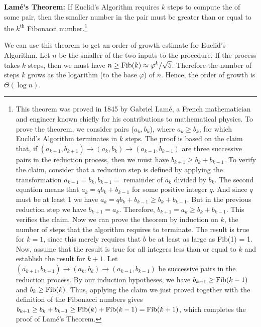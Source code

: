 \begin{niceQuote}
\textbf{Lam\'e's Theorem:} If Euclid's Algorithm requires \( k \) steps to
compute the  of some pair, then the smaller number in the pair
must be greater than or equal to the \( k^{\mathrm{th}} \) Fibonacci number.\footnote{This
theorem was proved in 1845 by Gabriel Lam\'e, a French mathematician and
engineer known chiefly for his contributions to mathematical physics.  To prove
the theorem, we consider pairs (\( a_k, b_k \)), where \( a_k \ge
b_k \), for which Euclid's Algorithm terminates in \( k \) steps.  The proof
is based on the claim that, if \( (a_{k+1}, b_{k+1}) \to
(a_k, b_k) \to (a_{k-1}, b_{k-1}) \) are three
successive pairs in the reduction process, then we must have \( b_{k+1} \ge
b_k + b_{k-1} \).  To verify the claim, consider that a reduction
step is defined by applying the transformation \( a_{k-1} = b_k,
b_{k-1} = \) remainder of \( a_k \) divided by \( b_k \).  The second
equation means that \( a_k = qb_k + b_{k-1} \) for some
positive integer \( q \).  And since \( q \) must be at least 1 we have \( a_k
= qb_k + b_{k-1} \ge b_k + b_{k-1} \).  But in
the previous reduction step we have \( b_{k+1} = a_k \).  Therefore,
\( b_{k+1} = a_k \ge b_k + b_{k-1} \).  This verifies
the claim.  Now we can prove the theorem by induction on \( k \), the number of
steps that the algorithm requires to terminate.  The result is true for \( k =
1 \), since this merely requires that \( b \) be at least as large as Fib(1)
= 1.  Now, assume that the result is true for all integers less than or equal
to \( k \) and establish the result for \( k + 1 \).  Let \( (a_{k+1},
b_{k+1}) \to (a_k, b_k) \to (a_{k-1}, b_{k-1}) \) be successive pairs in the
reduction process.  By our
induction hypotheses, we have \( b_{k-1} \ge {\rm Fib}(k - 1) \) and
\( b_k \ge {\rm Fib}(k) \).  Thus, applying the claim we just proved
together with the definition of the Fibonacci numbers gives \( b_{k+1} \ge
b_k + b_{k-1} \ge {\rm Fib}(k) + {\rm Fib}(k-1) =
{\rm Fib}(k+1) \), which completes the proof of Lam\'e's Theorem.}
\end{niceQuote}

\noindent
We can use this theorem to get an order-of-growth estimate for Euclid's
Algorithm.  Let \( n \) be the smaller of the two inputs to the procedure.  If
the process takes \( k \) steps, then we must have \( n \ge {\rm Fib}(k)
\approx \varphi^k / \sqrt{5} \).  Therefore the number of steps \( k \)
grows as the logarithm (to the base \( \varphi \)) of \( n \).  Hence, the order of
growth is \( \Theta(\log n) \).

